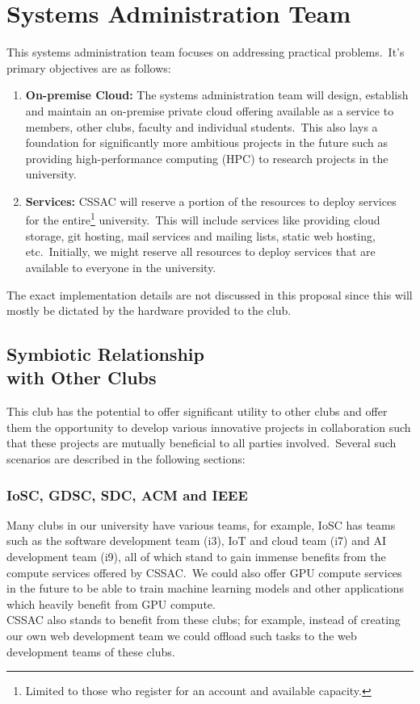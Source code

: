 \documentclass[11pt,twocolumn,oneside]{book}
\begin{document}
    \section{\large Systems Administration Team}\label{sec:systems-administration-team}
    This systems administration team focuses on addressing practical problems.\ It's primary objectives are as follows:
    \begin{enumerate}
        \item \textbf{On-premise Cloud:} The systems administration team will design, establish and maintain an
        on-premise private cloud offering available as a service to members, other clubs, faculty and individual
        students.\ This also lays a foundation for significantly more ambitious projects in the future such as providing
        high-performance computing (HPC) to research projects in the university.
        \item \textbf{Services:} CSSAC will reserve a portion of the resources to deploy services for the
        entire\footnote{Limited to those who register for an account and available capacity.} university.\ This will
        include services like providing cloud storage, git hosting, mail services and mailing lists, static web hosting,
        etc.\ Initially, we might reserve all resources to deploy services that are available to everyone in the
        university.
    \end{enumerate}
    The exact implementation details are not discussed in this proposal since this will mostly be dictated by the
    hardware provided to the club.

    \subsection[Symbiotic Relationship with Other Clubs]{Symbiotic Relationship \\ with Other Clubs}
    \label{subsec:symbiotic-relationship-with-other-clubs}
    This club has the potential to offer significant utility to other clubs and offer them the opportunity to develop
    various innovative projects in collaboration such that these projects are mutually beneficial to all parties
    involved.\ Several such scenarios are described in the following sections:

    \subsubsection{IoSC, GDSC, SDC, ACM and IEEE}
    Many clubs in our university have various teams, for example, IoSC has teams such as the software development team
    (i3), IoT and cloud team (i7) and AI development team (i9), all of which stand to gain immense benefits from the
    compute services offered by CSSAC.\ We could also offer GPU compute services in the future to be able to train
    machine learning models and other applications which heavily benefit from GPU compute.
    \\
    CSSAC also stands to benefit from these clubs; for example, instead of creating our own web development team we
    could offload such tasks to the web development teams of these clubs\@.
\end{document}
